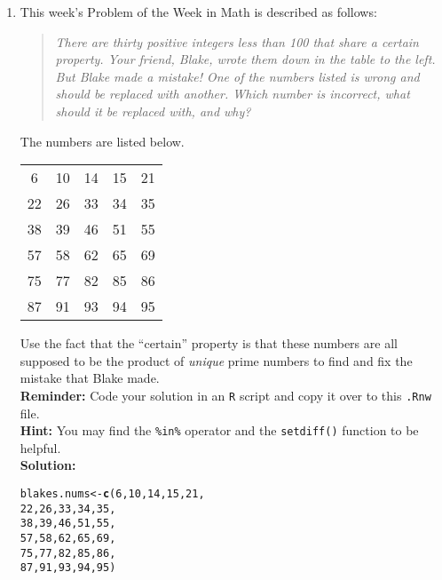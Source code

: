 \documentclass{article}\usepackage[]{graphicx}\usepackage[]{xcolor}
\makeatletter
\newcommand{\hlnum}[1]{\textcolor[rgb]{0.686,0.059,0.569}{#1}}%
\newcommand{\hldef}[1]{\textcolor[rgb]{0.345,0.345,0.345}{#1}}%
\newcommand{\hlkwb}[1]{\textcolor[rgb]{0.69,0.353,0.396}{#1}}%
\newcommand{\hlkwd}[1]{\textcolor[rgb]{0.737,0.353,0.396}{\textbf{#1}}}%
\newenvironment{kframe}{%
 \def\at@end@of@kframe{}%
 \ifinner\ifhmode%
  \def\at@end@of@kframe{\end{minipage}}%
  \begin{minipage}{\columnwidth}%
 \fi\fi%
 \def\FrameCommand##1{\hskip\@totalleftmargin \hskip-\fboxsep
 \colorbox{shadecolor}{##1}\hskip-\fboxsep
     \hskip-\linewidth \hskip-\@totalleftmargin \hskip\columnwidth}%
 \MakeFramed {\advance\hsize-\width
   \@totalleftmargin\z@ \linewidth\hsize
   \@setminipage}}%
 {\par\unskip\endMakeFramed%
 \at@end@of@kframe}
\newenvironment{knitrout}{}{} %
\makeatother
\begin{document}
\begin{enumerate}
\item This week's Problem of the Week in Math is described as follows:
\begin{quotation}
  \textit{There are thirty positive integers less than 100 that share a certain 
  property. Your friend, Blake, wrote them down in the table to the left. But 
  Blake made a mistake! One of the numbers listed is wrong and should be replaced 
  with another. Which number is incorrect, what should it be replaced with, and 
  why?}
\end{quotation}
The numbers are listed below.
\begin{center}
  \begin{tabular}{ccccc}
    6 & 10 & 14 & 15 & 21\\
    22 & 26 & 33 & 34 & 35\\
    38 & 39 & 46 & 51 & 55\\
    57 & 58 & 62 & 65 & 69\\
    75 & 77 & 82 & 85 & 86\\
    87 & 91 & 93 & 94 & 95
  \end{tabular}
\end{center}
Use the fact that the ``certain'' property is that these numbers are all supposed
to be the product of \emph{unique} prime numbers to find and fix the mistake that
Blake made.\\
\textbf{Reminder:} Code your solution in an \texttt{R} script and copy it over
to this \texttt{.Rnw} file.\\
\textbf{Hint:} You may find the \verb|%in%| operator and the \verb|setdiff()| function to be helpful.\\

\textbf{Solution:} 

\begin{knitrout}\scriptsize
{}\color{fgcolor}\begin{kframe}
\begin{alltt}
\hldef{blakes.nums} \hlkwb{<-} \hlkwd{c}\hldef{(}\hlnum{6}\hldef{,} \hlnum{10}\hldef{,} \hlnum{14}\hldef{,} \hlnum{15}\hldef{,} \hlnum{21}\hldef{,}
                 \hlnum{22}\hldef{,} \hlnum{26}\hldef{,} \hlnum{33}\hldef{,} \hlnum{34}\hldef{,} \hlnum{35}\hldef{,}
                 \hlnum{38}\hldef{,} \hlnum{39}\hldef{,} \hlnum{46}\hldef{,} \hlnum{51}\hldef{,} \hlnum{55}\hldef{,}
                 \hlnum{57}\hldef{,} \hlnum{58}\hldef{,} \hlnum{62}\hldef{,} \hlnum{65}\hldef{,} \hlnum{69}\hldef{,}
                 \hlnum{75}\hldef{,} \hlnum{77}\hldef{,} \hlnum{82}\hldef{,} \hlnum{85}\hldef{,} \hlnum{86}\hldef{,}
                 \hlnum{87}\hldef{,} \hlnum{91}\hldef{,} \hlnum{93}\hldef{,} \hlnum{94}\hldef{,} \hlnum{95}\hldef{)}


\end{alltt}
\end{kframe}
\end{knitrout}
\end{enumerate}
\end{document}
